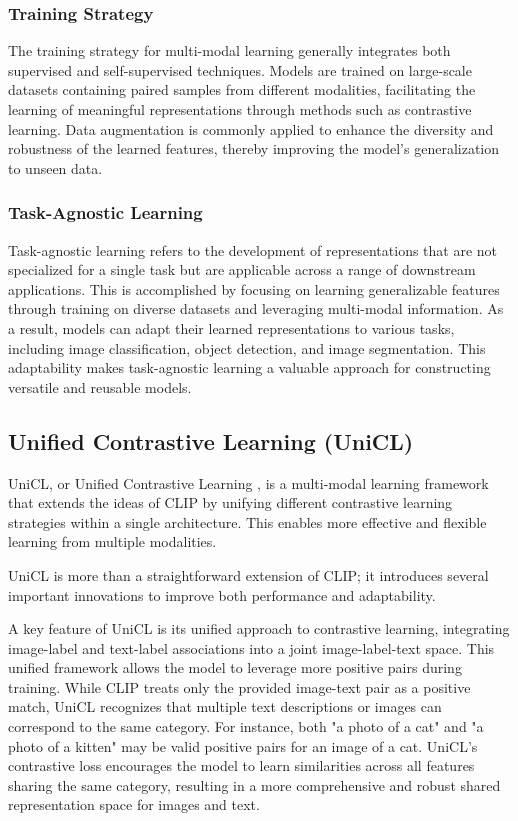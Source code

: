 \subsubsection{Training Strategy}
\label{subsec:training_strategy}
The training strategy for multi-modal learning generally integrates both supervised and self-supervised techniques. Models are trained on large-scale datasets containing paired samples from different modalities, facilitating the learning of meaningful representations through methods such as contrastive learning. Data augmentation is commonly applied to enhance the diversity and robustness of the learned features, thereby improving the model's generalization to unseen data.

\subsubsection{Task-Agnostic Learning}
\label{subsec:task_agnostic_learning}
Task-agnostic learning refers to the development of representations that are not specialized for a single task but are applicable across a range of downstream applications. This is accomplished by focusing on learning generalizable features through training on diverse datasets and leveraging multi-modal information. As a result, models can adapt their learned representations to various tasks, including image classification, object detection, and image segmentation. This adaptability makes task-agnostic learning a valuable approach for constructing versatile and reusable models.

\subsection{Unified Contrastive Learning (UniCL)}
\label{subsec:unicl}

UniCL, or Unified Contrastive Learning \cite{vl_unicl}, is a multi-modal learning framework that extends the ideas of CLIP by unifying different contrastive learning strategies within a single architecture. This enables more effective and flexible learning from multiple modalities.

UniCL is more than a straightforward extension of CLIP; it introduces several important innovations to improve both performance and adaptability.

A key feature of UniCL is its unified approach to contrastive learning, integrating image-label and text-label associations into a joint image-label-text space. This unified framework allows the model to leverage more positive pairs during training. While CLIP treats only the provided image-text pair as a positive match, UniCL recognizes that multiple text descriptions or images can correspond to the same category. For instance, both "a photo of a cat" and "a photo of a kitten" may be valid positive pairs for an image of a cat. UniCL's contrastive loss encourages the model to learn similarities across all features sharing the same category, resulting in a more comprehensive and robust shared representation space for images and text.

